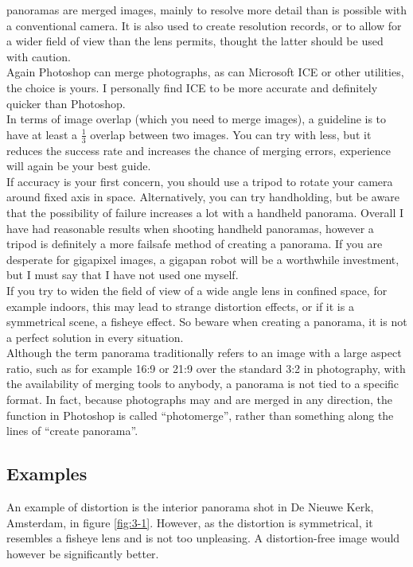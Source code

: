 \Glspl{panorama} are merged images, mainly to resolve more detail than is possible with a conventional camera. It is also used to create resolution records, or to allow for a wider field of view than the lens permits, thought the latter should be used with caution.
\\[\baselineskip]
Again Photoshop can merge photographs, as can Microsoft ICE or other utilities, the choice is yours. I personally find ICE to be more accurate and definitely quicker than Photoshop.
\\[\baselineskip]
In terms of image overlap (which you need to merge images), a guideline is to have at least a $\frac{1}{3}$ overlap between two images. You can try with less, but it reduces the success rate and increases the chance of merging errors, experience will again be your best guide.
\\[\baselineskip]
If accuracy is your first concern, you should use a tripod to rotate your camera around fixed axis in space. Alternatively, you can try handholding, but be aware that the possibility of failure increases a lot with a handheld panorama. Overall I have had reasonable results when shooting handheld \glspl{panorama}, however a tripod is definitely a more failsafe method of creating a \gls{panorama}. If you are desperate for gigapixel images, a gigapan robot will be a worthwhile investment, but I must say that I have not used one myself.
\\[\baselineskip]
If you try to widen the field of view of a wide angle lens in confined space, for example indoors, this may lead to strange distortion effects, or if it is a symmetrical scene, a fisheye effect. So beware when creating a \gls{panorama}, it is not a perfect solution in every situation.
\\[\baselineskip]
Although the term \gls{panorama} traditionally refers to an image with a large aspect ratio, such as for example 16:9 or 21:9 over the standard 3:2 in photography, with the availability of merging tools to anybody, a \gls{panorama} is not tied to a specific format. In fact, because photographs may and are merged in any direction, the function in Photoshop is called ``\Gls{photomerge}'', rather than something along the lines of ``create \gls{panorama}''.

\subsection{Examples}

An example of distortion is the interior \gls{panorama} shot in De Nieuwe Kerk, Amsterdam, in figure \ref{fig:3-1}. However, as the distortion is symmetrical, it resembles a fisheye lens and is not too unpleasing. A distortion-free image would however be significantly better.

